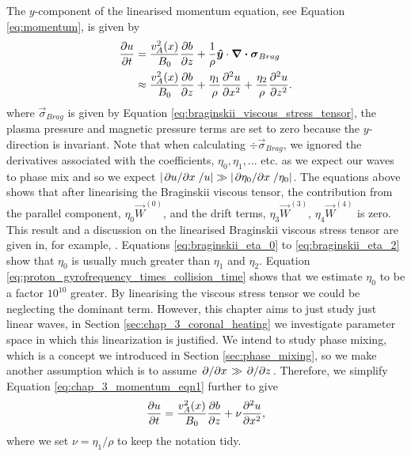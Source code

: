 The $y$-component of the linearised momentum equation, see Equation \eqref{eq:momentum}, is given by
\begin{equation}
    \label{eq:chap_3_momentum_eqn1}
    \begin{aligned}
    \pdv{u}{t} &= \frac{v_A^2(x)}{B_0}\pdv{b}{z} + \frac{1}{\rho}\boldsymbol{\hat{y}}\cdot\div{\boldsymbol{\sigma}_{Brag}} \\
    &\approx\frac{v_A^2(x)}{B_0}\pdv{b}{z} +\frac{\eta_1}{\rho} \pdv[2]{u}{x} + \frac{\eta_2}{\rho} \pdv[2]{u}{z}.
    \end{aligned}
\end{equation}
where $\vec{\sigma}_{Brag}$ is given by Equation \eqref{eq:braginskii_viscous_stress_tensor}, the plasma pressure and magnetic pressure terms are set to zero because the $y$-direction is invariant. Note that when calculating $\div\vec{\sigma}_{Brag}$, we ignored the derivatives associated with the coefficients, $\eta_0,\eta_1, ...$ etc. as we expect our waves to phase mix and so we expect $\abs{\pdv*{u}{x}/u}\gg\abs{\pdv*{\eta_0}{x}/\eta_0}$. The equations above shows that after linearising the Braginskii viscous tensor, the contribution from the parallel component, $\eta_0\vec{W}^{(0)}$, and the drift terms, $\eta_3\vec{W}^{(3)}$, $\eta_4\vec{W}^{(4)}$ is zero. This result and a discussion on the linearised Braginskii viscous stress tensor are given in, for example, \citet{Ruderman2000,Mocanu2008}. Equations \eqref{eq:braginskii_eta_0} to \eqref{eq:braginskii_eta_2} show that $\eta_0$ is usually much greater than $\eta_1$ and $\eta_2$. Equation \eqref{eq:proton_gyrofrequency_times_collision_time} shows that we estimate $\eta_0$ to be a factor $10^{10}$ greater. By linearising the viscous stress tensor we could be neglecting the dominant term. However, this chapter aims to just study just linear waves, in Section \ref{sec:chap_3_coronal_heating} we investigate parameter space in which this linearization is justified. We intend to study phase mixing, which is a concept we introduced in Section \ref{sec:phase_mixing}, so we make another assumption which is to assume $\pdv*{}{x}\gg\pdv*{}{z}$. Therefore, we simplify Equation \eqref{eq:chap_3_momentum_eqn1} further to give
\begin{equation}
    \label{eq:chap_3_momentum_eqn2}
    \pdv{u}{t}=\frac{v_A^2(x)}{B_0}\pdv{b}{z} +\nu\pdv[2]{u}{x},
\end{equation}
where we set $\nu = \eta_1/\rho$ to keep the notation tidy.

